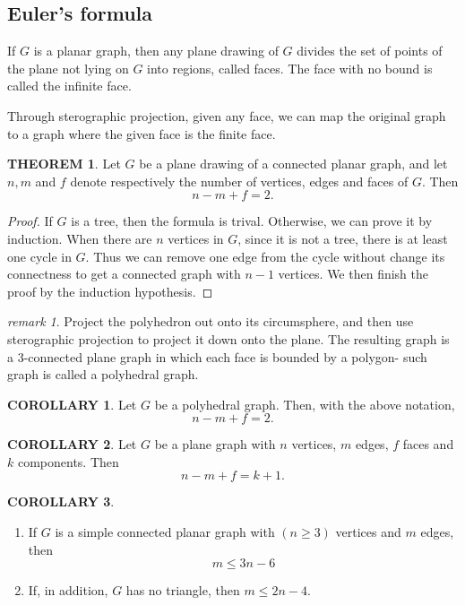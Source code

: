 \documentclass[a4paper,11pt]{article}%
\theoremstyle{remark}
\newtheorem*{remark}{remark}
\theoremstyle{definition}
\newtheorem{theorem}{THEOREM}[section]
\theoremstyle{definition}
\newtheorem{corollary}{COROLLARY}[section]
\theoremstyle{definition}
\theoremstyle{definition}
\theoremstyle{plain}
\theoremstyle{definition}
\begin{document}
\subsection{Euler's formula}
If $G$ is a planar graph, then any plane drawing of $G$ divides the set of points of the plane not lying on $G$ into regions, called faces.
The face with no bound is called the infinite face.

Through sterographic projection, given any face, we can map the original graph to a graph where the given face is the finite face.
\begin{theorem}
    Let $G$ be a plane drawing of a connected planar graph, and let $n,m$ and $f$ denote respectively the number of vertices, edges and faces of $G$. Then
    \[n-m+f=2.\]
    \begin{proof}
        If $G$ is a tree, then the formula is trival. Otherwise, we can prove it by induction.
        When there are $n$ vertices in $G$, since it is not a tree, there is at least one cycle in $G$. Thus we can remove one edge from the cycle 
        without change its connectness to get a connected graph with $n-1$ vertices. We then finish the proof by the induction hypothesis.
    \end{proof}
\end{theorem}
\begin{remark}
    Project the polyhedron out onto its circumsphere, and then use sterographic projection to project it down onto the plane.
    The resulting graph is a 3-connected plane graph in which each face is bounded by a polygon- such graph is called a polyhedral graph.
\end{remark}
\begin{corollary}
    Let $G$ be a polyhedral graph. Then, with the above notation,
    \[n-m+f=2.\]
\end{corollary}
\begin{corollary}
    Let $G$ be a plane graph with $n$ vertices, $m$ edges, $f$ faces and $k$ components.
    Then 
    \[n-m+f=k+1.\]
\end{corollary}
\begin{corollary}
    \begin{enumerate}
        \item If $G$ is a simple connected planar graph with $(n\geq 3)$ vertices and $m$ edges, then 
        \[m\leq 3n-6\]
        \item If, in addition, $G$ has no triangle, then $m\leq 2n-4$.
    \end{enumerate}
\end{corollary}
\end{document}
